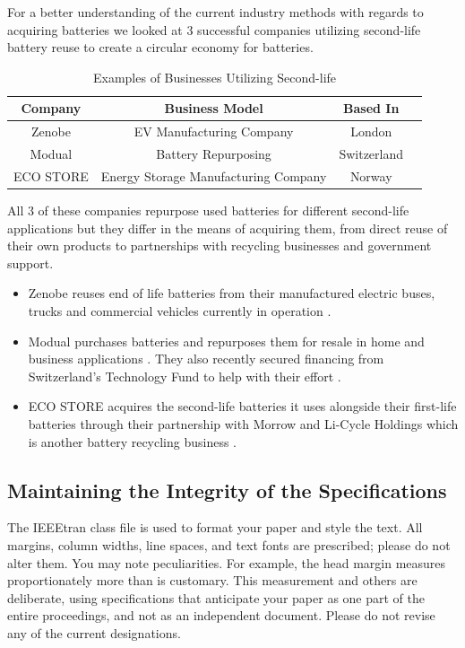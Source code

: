 \documentclass[conference]{IEEEtran}
\begin{document}
For a better understanding of the current industry methods with regards to acquiring batteries we looked at 3 successful companies utilizing second-life battery reuse to create a circular economy for batteries.

\begin{table}[htbp]
\caption{Examples of Businesses Utilizing  Second-life}
\begin{center}
\begin{tabular}{|c|c|c|c|}
\hline
\textbf{Company} & \textbf{Business Model} & \textbf{Based In} \\ \hline
Zenobe & EV Manufacturing Company & London \\ \hline
Modual & Battery Repurposing & Switzerland \\ \hline
ECO STORE & Energy Storage Manufacturing Company & Norway \\ \hline
\end{tabular}
\end{center}
\end{table}

All 3 of these companies repurpose used batteries for different second-life applications but they differ in the means of acquiring them, from direct reuse of their own products to partnerships with recycling businesses and government support.

\begin{itemize}
  \item Zenobe reuses end of life batteries from their manufactured electric buses, trucks and commercial vehicles currently in operation \cite{b5}.
  \item Modual purchases batteries and repurposes them for resale in home and business applications \cite{b6}. They also recently secured financing from Switzerland’s Technology Fund to help with their effort \cite{b7}.
  \item ECO STORE acquires the second-life batteries it uses alongside their first-life batteries through their partnership with Morrow and Li-Cycle Holdings which is another battery recycling business \cite{b8, b9}.
\end{itemize}



\subsection{Maintaining the Integrity of the Specifications}

The IEEEtran class file is used to format your paper and style the text. All margins, 
column widths, line spaces, and text fonts are prescribed; please do not 
alter them. You may note peculiarities. For example, the head margin
measures proportionately more than is customary. This measurement 
and others are deliberate, using specifications that anticipate your paper 
as one part of the entire proceedings, and not as an independent document. 
Please do not revise any of the current designations.
\end{document}
